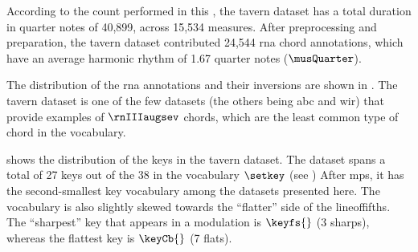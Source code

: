 
According to the count performed in this \thesisdiss{}, the
\gls{tavern} dataset has a total duration in quarter notes
of 40,899, across 15,534 measures. After preprocessing and
preparation, the \gls{tavern} dataset contributed 24,544
\gls{rna} chord annotations, which have an average harmonic
rhythm of 1.67 quarter notes ($\musQuarter$).

The distribution of the \gls{rna} annotations and their
inversions are shown in . The
\gls{tavern} dataset is one of the few datasets (the others
being \gls{abc} and \gls{wir}) that provide examples of
$\rnIIIaugsev$ chords, which are the least common type of
chord in the vocabulary.



 shows the distribution of the
keys in the \gls{tavern} dataset. The dataset spans a total
of 27 keys out of the 38 in the vocabulary $\setkey$ (see ) After \gls{mps},
it has the second-smallest key vocabulary among the datasets
presented here. The vocabulary is also slightly skewed
towards the ``flatter'' side of the \gls{lineoffifths}. The
``sharpest'' key that appears in a modulation is $\keyfs{}$ (3
sharps), whereas the flattest key is $\keyCb{}$ (7 flats).
